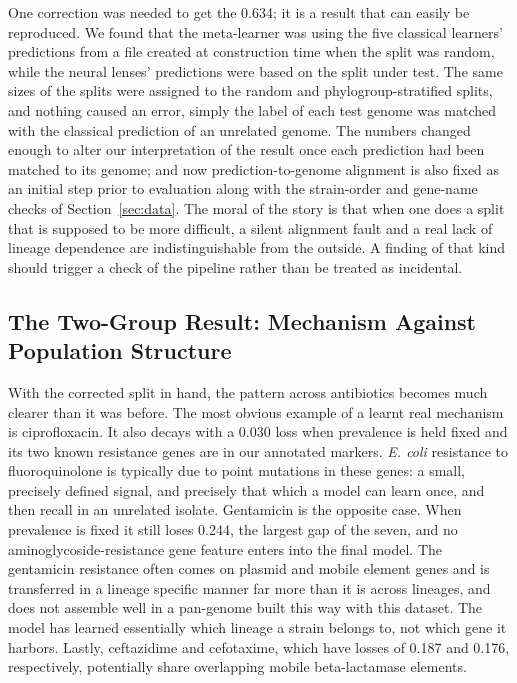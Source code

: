 \vspace{1em}

One correction was needed to get the 0.634; it is a result that can easily be reproduced. We
found that the meta-learner was using the five classical learners' predictions from a file
created at construction time when the split was random, while the neural lenses' predictions were
based on the split under test. The same sizes of the splits were assigned to the random and
phylogroup-stratified splits, and nothing caused an error, simply the label of each test genome was
matched with the classical prediction of an unrelated genome. The numbers changed enough to alter
our interpretation of the result once each prediction had been matched to its genome; and now
prediction-to-genome alignment is also fixed as an initial step prior to evaluation along with the
strain-order and gene-name checks of Section~\ref{sec:data}. The moral of the story is that when
one does a split that is supposed to be more difficult, a silent alignment fault and a real lack of
lineage dependence are indistinguishable from the outside. A finding of that kind should trigger
a check of the pipeline rather than be treated as incidental.

\FloatBarrier
\subsection{The Two-Group Result: Mechanism Against Population Structure}

With the corrected split in hand, the pattern across antibiotics becomes much
clearer than it was before. The most obvious example of a learnt real mechanism is ciprofloxacin.
It also decays with a 0.030 loss when prevalence is held fixed and its two known
resistance genes are in our annotated markers. \textit{E. coli} resistance to fluoroquinolone is
typically due to point mutations in these genes: a small, precisely defined signal, and precisely
that which a model can learn once, and then recall in an unrelated isolate.
Gentamicin is the opposite case. When prevalence is fixed it still loses 0.244, the largest gap of
the seven, and no aminoglycoside-resistance gene feature enters into the final model. The
gentamicin resistance often comes on plasmid and mobile element genes and is transferred in a
lineage specific manner far more than it is across lineages, and does not assemble well in a
pan-genome built this way with this dataset. The model has learned essentially which lineage a
strain belongs to, not which gene it harbors. Lastly, ceftazidime and cefotaxime, which have losses
of 0.187 and 0.176, respectively, potentially share overlapping mobile beta-lactamase elements.

